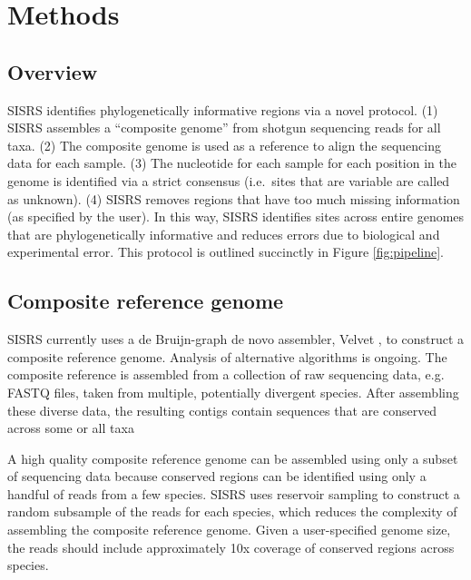 \documentclass[11pt, oneside]{article}   	%
\begin{document}
\section{Methods\label{sec:Methods}}

\subsection{Overview}

SISRS identifies phylogenetically informative regions via a novel protocol. 
(1) SISRS assembles a ``composite genome'' from shotgun sequencing reads for all taxa.
(2) The composite genome is used as a reference to align the sequencing data for each sample. 
(3) The nucleotide for each sample for each position in the genome is identified via a strict consensus (i.e.\ sites that are variable are called as unknown). 
(4) SISRS removes regions that have too much missing information (as specified by the user).
In this way, SISRS identifies sites across entire genomes that are phylogenetically informative and reduces errors due to biological and experimental error.
This protocol is outlined succinctly in Figure \ref{fig:pipeline}. 

\subsection{Composite reference genome}

SISRS currently uses a de Bruijn-graph de novo assembler, Velvet \citep{Zerbino2008}, to construct a composite reference genome.
Analysis of alternative algorithms is ongoing.
The composite reference is assembled from a collection of raw sequencing data, e.g. FASTQ files, taken from multiple, potentially divergent species.
After assembling these diverse data, the resulting contigs contain sequences that are conserved across some or all taxa

A high quality composite reference genome can be assembled using only a subset of sequencing data because conserved regions can be identified using only a handful of reads from a few species. 
SISRS uses reservoir sampling \citep{Vitter1985} to construct a random subsample of the reads for each species, which reduces the complexity of assembling the composite reference genome.
Given a user-specified genome size, the reads should include approximately 
10x coverage of conserved regions across species.
\end{document}

